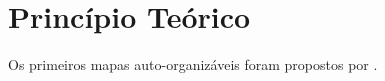 \documentclass[journal, a4paper]{IEEEtran}
\begin{document}
\section{Princípio Teórico}

Os primeiros mapas auto-organizáveis foram propostos por \citet{Malsburg1976}.

%
%
%
%
%
\end{document}
